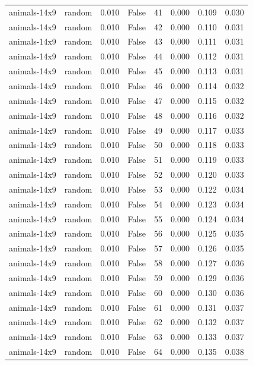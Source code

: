 \begin{tabular}{llrrrrrr}
animals-14x9 & random & 0.010 & False & 41 & 0.000 & 0.109 & 0.030 \\
animals-14x9 & random & 0.010 & False & 42 & 0.000 & 0.110 & 0.031 \\
animals-14x9 & random & 0.010 & False & 43 & 0.000 & 0.111 & 0.031 \\
animals-14x9 & random & 0.010 & False & 44 & 0.000 & 0.112 & 0.031 \\
animals-14x9 & random & 0.010 & False & 45 & 0.000 & 0.113 & 0.031 \\
animals-14x9 & random & 0.010 & False & 46 & 0.000 & 0.114 & 0.032 \\
animals-14x9 & random & 0.010 & False & 47 & 0.000 & 0.115 & 0.032 \\
animals-14x9 & random & 0.010 & False & 48 & 0.000 & 0.116 & 0.032 \\
animals-14x9 & random & 0.010 & False & 49 & 0.000 & 0.117 & 0.033 \\
animals-14x9 & random & 0.010 & False & 50 & 0.000 & 0.118 & 0.033 \\
animals-14x9 & random & 0.010 & False & 51 & 0.000 & 0.119 & 0.033 \\
animals-14x9 & random & 0.010 & False & 52 & 0.000 & 0.120 & 0.033 \\
animals-14x9 & random & 0.010 & False & 53 & 0.000 & 0.122 & 0.034 \\
animals-14x9 & random & 0.010 & False & 54 & 0.000 & 0.123 & 0.034 \\
animals-14x9 & random & 0.010 & False & 55 & 0.000 & 0.124 & 0.034 \\
animals-14x9 & random & 0.010 & False & 56 & 0.000 & 0.125 & 0.035 \\
animals-14x9 & random & 0.010 & False & 57 & 0.000 & 0.126 & 0.035 \\
animals-14x9 & random & 0.010 & False & 58 & 0.000 & 0.127 & 0.036 \\
animals-14x9 & random & 0.010 & False & 59 & 0.000 & 0.129 & 0.036 \\
animals-14x9 & random & 0.010 & False & 60 & 0.000 & 0.130 & 0.036 \\
animals-14x9 & random & 0.010 & False & 61 & 0.000 & 0.131 & 0.037 \\
animals-14x9 & random & 0.010 & False & 62 & 0.000 & 0.132 & 0.037 \\
animals-14x9 & random & 0.010 & False & 63 & 0.000 & 0.133 & 0.037 \\
animals-14x9 & random & 0.010 & False & 64 & 0.000 & 0.135 & 0.038 \\

\end{tabular}
